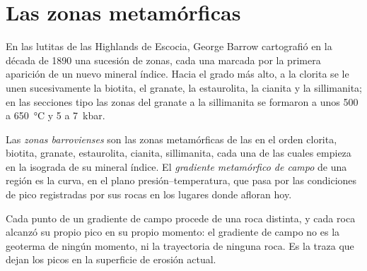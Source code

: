 \section{Las zonas metamórficas}\label{sec:b2:pt-paths:zones}

En las lutitas de las Highlands de Escocia, George Barrow cartografió en la década de 1890 una sucesión de
zonas, cada una marcada por la primera aparición de un nuevo mineral índice. Hacia el grado
más alto, a la clorita se le unen sucesivamente la biotita, el granate, la estaurolita, la cianita y la sillimanita;
en las secciones tipo las zonas del granate a la sillimanita se formaron a unos 500 a
\qty{650}{\celsius} y 5 a \qty{7}{kbar}.

\begin{definition}\label{def:b2:pt-paths:barrovian}
Las \emph{zonas barrovienses} son las zonas metamórficas de las
 en el orden clorita, biotita, granate, estaurolita, cianita, sillimanita,
cada una de las cuales empieza en la isograda de su mineral índice. El \emph{gradiente metamórfico de
campo} de una región es la curva, en el
plano presión--temperatura, que pasa por las condiciones de pico registradas por sus rocas en los
lugares donde afloran hoy.
\end{definition}

Cada punto de un gradiente de campo procede de una roca distinta, y cada roca alcanzó su propio
pico en su propio momento: el gradiente de campo no es la geoterma de ningún momento, ni la
trayectoria de ninguna roca. Es la traza que dejan los picos en la superficie de erosión actual.


